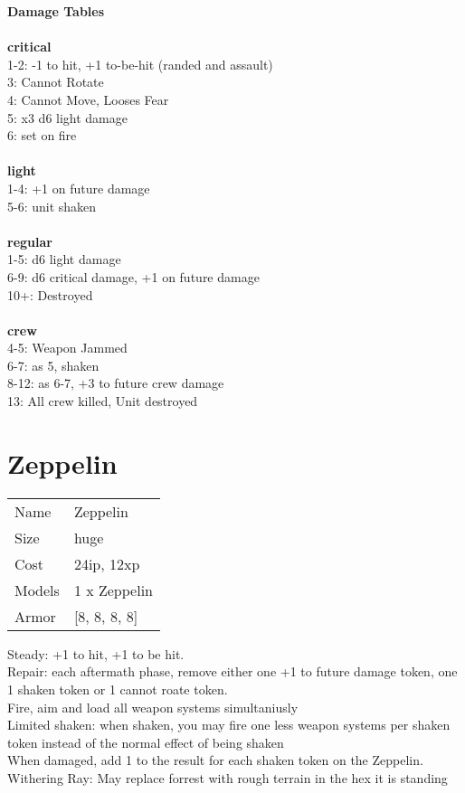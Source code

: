{\bf Damage Tables} \\
\ \\ {\bf critical } \\
1-2: -1 to hit, +1 to-be-hit (randed and assault) \\
3: Cannot Rotate \\
4: Cannot Move, Looses Fear \\
5: x3 d6 light damage \\
6: set on fire \\
\ \\ {\bf light } \\
1-4: +1 on future damage \\
5-6: unit shaken \\
\ \\ {\bf regular } \\
1-5: d6 light damage \\
6-9: d6 critical damage, +1 on future damage \\
10+: Destroyed \\
\ \\ {\bf crew } \\
4-5: Weapon Jammed \\
6-7: as 5, shaken \\
8-12: as 6-7, +3 to future crew damage \\
13: All crew killed, Unit destroyed \\










\pagebreak\pagebreak

\section{ Zeppelin }

\begin{tabular}{ll}
  Name & Zeppelin \\
  Size & huge\\
  Cost & 24ip, 12xp\\
  Models & 1 x Zeppelin\\
  Armor & [8, 8, 8, 8]\\
\end{tabular}

\noindent Steady: +1 to hit, +1 to be hit.\\ 
Repair: each aftermath phase, remove either one +1 to future damage token, one 1 shaken token or 1 cannot roate token.\\ 
Fire, aim and load all weapon systems simultaniusly\\ 
Limited shaken: when shaken, you may fire one less weapon systems per shaken token instead of the normal effect of being shaken\\ 
 When damaged, add 1 to the result for each shaken token on the Zeppelin.\\ 
Withering Ray: May replace forrest with rough terrain in the hex it is standing\\ 


